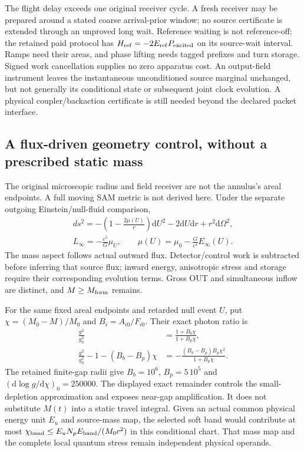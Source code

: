 \documentclass[10pt,twocolumn,letterpaper]{article}
\newcommand{\dd}{\mathrm{d}}
\begin{document}
The flight delay exceeds one original receiver cycle. A fresh receiver
may be prepared around a stated coarse arrival-prior window; no source
certificate is extended through an unproved long wait. Reference waiting
is not reference-off: the retained paid protocol has
$H_{\rm ref}=-2E_{\rm ref}P_{\rm excited}$ on its source-wait interval.
Ramps need their areas, and phase lifting needs tagged prefixes and turn
storage. Signed work cancellation supplies no zero apparatus cost.
An output-field instrument leaves the instantaneous unconditioned source
marginal unchanged, but not generally its conditional state or subsequent
joint clock evolution. A physical coupler/backaction certificate is still
needed beyond the declared packet interface.

\subsection{A flux-driven geometry control, without a prescribed static mass}
The original microscopic radius and field receiver are not the annulus's
areal endpoints. A full moving SAM metric is not derived here. Under the
separate outgoing Einstein/null-fluid comparison,
\begin{equation}
 \begin{gathered}
 ds^2=-\left(1-\frac{2\mu(U)}r\right)\dd U^2-2\dd U\dd r
                       +r^2\dd\Omega^2,\\
 L_\infty=-\frac{c^5}{G}\mu_U,\qquad
 \mu(U)=\mu_0-\frac{G}{c^4}E_\infty(U).
 \end{gathered}
\end{equation}
The mass aspect follows actual outward flux. Detector/control work is
subtracted before inferring that source flux; inward energy, anisotropic
stress and storage require their corresponding evolution terms. Gross OUT
and simultaneous inflow are distinct, and $M\ge M_{\rm form}$ remains.

For the same fixed areal endpoints and retarded null event $U$, put
$\chi=(M_0-M)/M_0$ and $B_i=A_{i0}/F_{i0}$. Their exact photon ratio is
\begin{equation}
 \begin{split}
 \frac{g^2}{g_0^2}&=\frac{1+B_b\chi}{1+B_p\chi},\\
 \frac{g^2}{g_0^2}-1-(B_b-B_p)\chi
       &=-\frac{(B_b-B_p)B_p\chi^2}{1+B_p\chi}.
 \end{split}
\end{equation}
The retained finite-gap radii give $B_b=10^6$, $B_p=5\,10^5$ and
$(\dd\log g/\dd\chi)_0=250000$. The displayed exact remainder controls
the small-depletion approximation and exposes near-gap amplification.
It does not substitute $M(t)$ into a static travel integral. Given an
actual common physical energy unit $E_u$ and source-mass map, the selected
soft band would contribute at most
$\chi_{\rm band}\le E_uN_pE_{\rm band}/(M_0c^2)$ in this conditional
chart. That mass map and the complete local quantum stress remain
independent physical operands.
\end{document}
